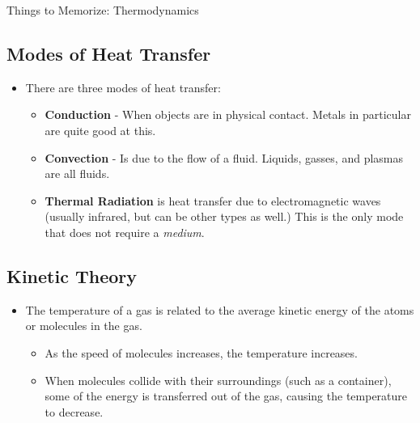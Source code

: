 \documentclass[letterpaper, 12pt]{article}
\begin{document}
	


\begin{center}Things to Memorize: Thermodynamics
\end{center}

\subsection*{Modes of Heat Transfer}
\begin{itemize}
	\item There are three modes of heat transfer: 
	\begin{itemize}
		\item \textbf{Conduction} - When objects are in physical contact.  Metals in particular are quite good at this.
		\item \textbf{Convection} - Is due to the flow of a fluid.  Liquids, gasses, and plasmas are all fluids.
		\item \textbf{Thermal Radiation} is heat transfer due to electromagnetic waves (usually infrared, but can be other types as well.)  This is the only mode that does not require a \textit{medium}. 
	\end{itemize}
\end{itemize}

\subsection*{Kinetic Theory}
\begin{itemize}
	\item The temperature of a gas is related to the average kinetic energy of the atoms or molecules in the gas.  
	\begin{itemize}
		\item As the speed of molecules increases, the temperature increases.
		\item When molecules collide with their surroundings (such as a container), some of the energy is transferred out of the gas, causing the temperature to decrease. 
	\end{itemize}
	
	
\end{itemize}
\end{document}
